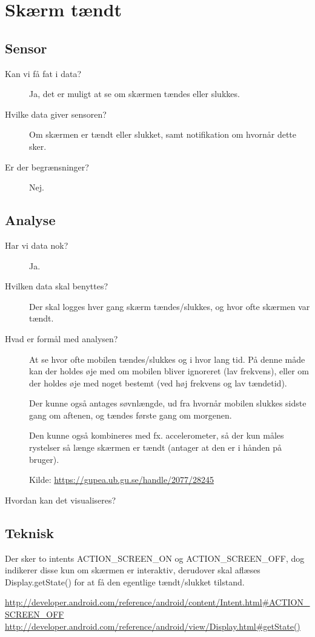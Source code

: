 \section{Skærm tændt}

\subsection{Sensor}

\begin{description}
\item[Kan vi få fat i data?]
Ja, det er muligt at se om skærmen tændes eller slukkes.

\item[Hvilke data giver sensoren?]
Om skærmen er tændt eller slukket, samt notifikation om hvornår dette sker.

\item[Er der begrænsninger?]
Nej.

\end{description}

\subsection{Analyse}
\begin{description}
\item[Har vi data nok?]
Ja.

\item[Hvilken data skal benyttes?]
Der skal logges hver gang skærm tændes/slukkes, og hvor ofte skærmen var tændt.

\item[Hvad er formål med analysen?]
At se hvor ofte mobilen tændes/slukkes og i hvor lang tid.
På denne måde kan der holdes øje med om mobilen bliver ignoreret (lav frekvens), eller om der holdes øje med noget bestemt (ved høj frekvens og lav tændetid).

Der kunne også antages søvnlængde, ud fra hvornår mobilen slukkes sidste gang om aftenen, og tændes første gang om morgenen.

Den kunne også kombineres med fx. accelerometer, så der kun måles rystelser så længe skærmen er tændt (antager at den er i hånden på bruger).

Kilde: \url{https://gupea.ub.gu.se/handle/2077/28245}

\item[Hvordan kan det visualiseres?]

\end{description}

\subsection{Teknisk}
Der sker to intents ACTION\_SCREEN\_ON og ACTION\_SCREEN\_OFF, dog indikerer disse kun om skærmen er interaktiv, derudover skal aflæses Display.getState() for at få den egentlige tændt/slukket tilstand.

\url{http://developer.android.com/reference/android/content/Intent.html#ACTION_SCREEN_OFF}\\
\url{http://developer.android.com/reference/android/view/Display.html#getState()}
